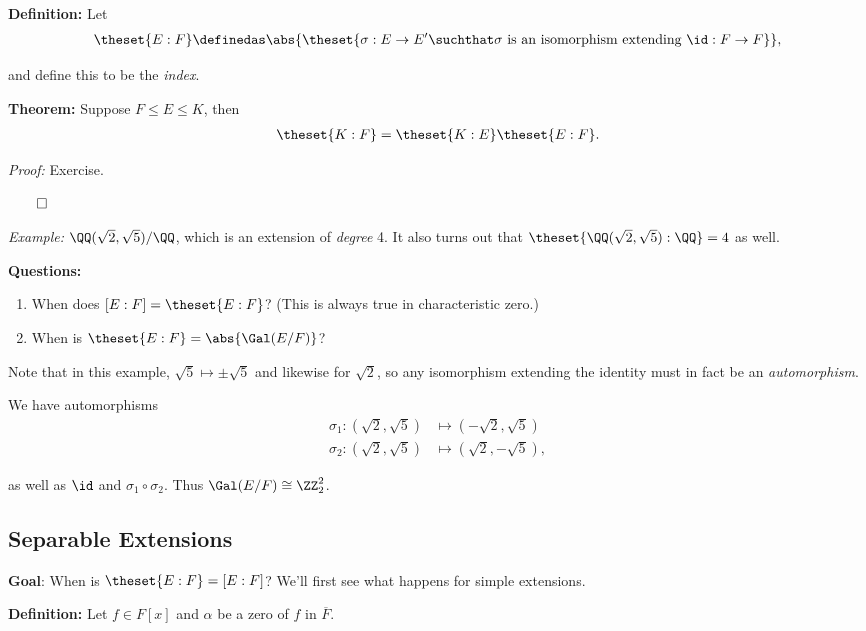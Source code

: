 \textbf{Definition:} Let
\begin{align*}
\theset{E: F} \definedas
\abs{ \theset{\sigma: E \to E' \suchthat \sigma \text{ is an isomorphism extending } \id: F \to F}}
,\end{align*}

and define this to be the \emph{index}.

\textbf{Theorem:} Suppose \(F \leq E \leq K\), then
\begin{align*}
\theset{K: F} = \theset{K: E} \theset{E: F}.
\end{align*}

\emph{Proof:} Exercise.

\(\qed\)

\emph{Example:} \(\QQ(\sqrt 2, \sqrt 5)/\QQ\), which is an extension of
\emph{degree} 4. It also turns out that
\(\theset{\QQ(\sqrt 2, \sqrt 5) : \QQ} = 4\) as well.

\textbf{Questions:}

\begin{enumerate}
\def\labelenumi{\arabic{enumi}.}
\item
  When does \([E: F] = \theset{E: F}\)? (This is always true in
  characteristic zero.)
\item
  When is \(\theset{E: F} = \abs{\Gal(E/F)}\)?
\end{enumerate}

Note that in this example, \(\sqrt 5 \mapsto \pm \sqrt 5\) and likewise
for \(\sqrt 2\), so any isomorphism extending the identity must in fact
be an \emph{automorphism}.

We have automorphisms \begin{align*}
\sigma_1: (\sqrt 2, \sqrt 5) &\mapsto (-\sqrt 2,\sqrt 5) \\
\sigma_2: (\sqrt 2, \sqrt 5) &\mapsto (\sqrt 2, -\sqrt 5)
,\end{align*}

as well as \(\id\) and \(\sigma_1 \circ \sigma_2\). Thus
\(\Gal(E/F) \cong \ZZ_2^2\).

\hypertarget{separable-extensions}{%
\subsection{Separable Extensions}\label{separable-extensions}}

\textbf{Goal}: When is \(\theset{E: F} = [E: F]\)? We'll first see what
happens for simple extensions.

\textbf{Definition:} Let \(f \in F[x]\) and \(\alpha\) be a zero of
\(f\) in \(\overline F\).

